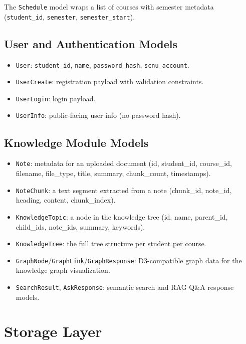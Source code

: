 \documentclass[12pt,a4paper]{article}
\begin{document}
The \texttt{Schedule} model wraps a list of courses with semester metadata (\texttt{student\_id}, \texttt{semester}, \texttt{semester\_start}).

\subsection{User and Authentication Models}

\begin{itemize}[nosep]
    \item \texttt{User}: \texttt{student\_id}, \texttt{name}, \texttt{password\_hash}, \texttt{scnu\_account}.
    \item \texttt{UserCreate}: registration payload with validation constraints.
    \item \texttt{UserLogin}: login payload.
    \item \texttt{UserInfo}: public-facing user info (no password hash).
\end{itemize}

\subsection{Knowledge Module Models}

\begin{itemize}[nosep]
    \item \texttt{Note}: metadata for an uploaded document (id, student\_id, course\_id, filename, file\_type, title, summary, chunk\_count, timestamps).
    \item \texttt{NoteChunk}: a text segment extracted from a note (chunk\_id, note\_id, heading, content, chunk\_index).
    \item \texttt{KnowledgeTopic}: a node in the knowledge tree (id, name, parent\_id, child\_ids, note\_ids, summary, keywords).
    \item \texttt{KnowledgeTree}: the full tree structure per student per course.
    \item \texttt{GraphNode}/\texttt{GraphLink}/\texttt{GraphResponse}: D3-compatible graph data for the knowledge graph visualization.
    \item \texttt{SearchResult}, \texttt{AskResponse}: semantic search and RAG Q\&A response models.
\end{itemize}

\section{Storage Layer}
\label{sec:storage}
\end{document}
